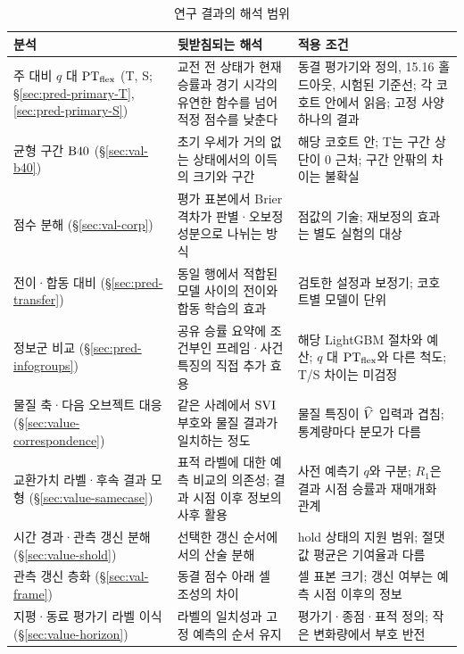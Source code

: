 \begin{table}[!t]
  \centering
  \caption{연구 결과의 해석 범위}
  \label{tab:scope}
  \footnotesize
  \begin{tabularx}{\linewidth}{@{}>{\raggedright\arraybackslash}p{3.1cm}>{\raggedright\arraybackslash}p{5.3cm}X@{}}
    \toprule
    분석 & 뒷받침되는 해석 & 적용 조건 \\
    \midrule
    주 대비 $q$ 대 $\mathrm{PT}_{\mathrm{flex}}$ (T, S; §\ref{sec:pred-primary-T}, \ref{sec:pred-primary-S}) & 교전 전 상태가 현재 승률과 경기 시각의 유연한 함수를 넘어 적정 점수를 낮춘다 & 동결 평가기와 정의, 15.16 홀드아웃, 시험된 기준선; 각 코호트 안에서 읽음; 고정 사양 하나의 결과 \\ %
    균형 구간 $\mathrm{B40}$ (§\ref{sec:val-b40}) & 초기 우세가 거의 없는 상태에서의 이득의 크기와 구간 & 해당 코호트 안; T는 구간 상단이 0 근처; 구간 안팎의 차이는 불확실 \\ %
    점수 분해 (§\ref{sec:val-corp}) & 평가 표본에서 Brier 격차가 판별·오보정 성분으로 나뉘는 방식 & 점값의 기술; 재보정의 효과는 별도 실험의 대상 \\ %
    전이·합동 대비 (§\ref{sec:pred-transfer}) & 동일 행에서 적합된 모델 사이의 전이와 합동 학습의 효과 & 검토한 설정과 보정기; 코호트별 모델이 단위 \\ %
    정보군 비교 (§\ref{sec:pred-infogroups}) & 공유 승률 요약에 조건부인 프레임·사건 특징의 직접 추가 효용 & 해당 LightGBM 절차와 예산; $q$ 대 $\mathrm{PT}_{\mathrm{flex}}$와 다른 척도; T/S 차이는 미검정 \\ %
    물질 축·다음 오브젝트 대응 (§\ref{sec:value-correspondence}) & 같은 사례에서 $\mathrm{SVI}$ 부호와 물질 결과가 일치하는 정도 & 물질 특징이 $\widehat V$ 입력과 겹침; 통계량마다 분모가 다름 \\ %
    교환가치 라벨·후속 결과 모형 (§\ref{sec:value-samecase}) & 표적 라벨에 대한 예측 비교의 의존성; 결과 시점 이후 정보의 사후 활용 & 사전 예측기 $q$와 구분; $R_1$은 결과 시점 승률과 재매개화 관계 \\ %
    시간 경과·관측 갱신 분해 (§\ref{sec:value-shold}) & 선택한 갱신 순서에서의 산술 분해 & hold 상태의 지원 범위; 절댓값 평균은 기여율과 다름 \\ %
    관측 갱신 층화 (§\ref{sec:val-frame}) & 동결 점수 아래 셀 조성의 차이 & 셀 표본 크기; 갱신 여부는 예측 시점 이후의 정보 \\ %
    지평·동료 평가기 라벨 이식 (§\ref{sec:value-horizon}) & 라벨의 일치성과 고정 예측의 순서 유지 & 평가기·종점·표적 정의; 작은 변화량에서 부호 반전 \\

\end{tabularx}
\end{table}
